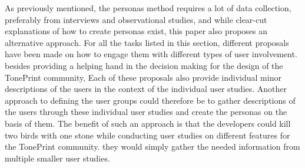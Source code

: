 As previously mentioned, the personas method requires a lot of data collection, preferably from interviews and observational studies, and while clear-cut explanations of how to create personas exist, this paper also proposes an alternative approach. For all the tasks listed in this section, different proposals have been made on how to engage them with different types of user involvement. besides providing a helping hand in the decision making for the design of the TonePrint community, Each of these proposals also provide individual minor descriptions of the users in the context of the individual user studies. Another approach to defining the user groups could therefore be to gather descriptions of the users through these individual user studies and create the personas on the basis of them. The benefit of such an approach is that the developers could kill two birds with one stone while conducting user studies on different features for the TonePrint community. they would simply gather the needed information from multiple smaller user studies.
